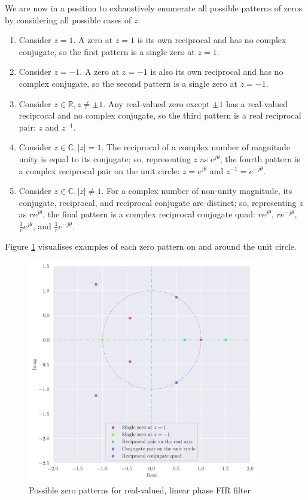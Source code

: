 \newpage

We are now in a position to exhaustively enumerate all possible patterns of zeros by considering all possible cases of $z$.
\begin{enumerate}[label=(\roman*)]
    \item Consider $z=1$. A zero at $z=1$ is its own reciprocal and has no complex conjugate, so the first pattern is a single zero at $z=1$.

    \item Consider $z=-1$. A zero at $z=-1$ is also its own reciprocal and has no complex conjugate, so the second pattern is a single zero at $z=-1$.

    \item Consider $z\in\mathbb{R},z\neq\pm 1$. Any real-valued zero except $\pm 1$ has a real-valued reciprocal and no complex conjugate, so the third pattern is a real reciprocal pair: $z$ and $z^{-1}$.

    \item Consider $z\in\mathbb{C},|z|=1$. The reciprocal of a complex number of magnitude unity is equal to its conjugate; so, representing $z$ as $e^{j\theta}$, the fourth pattern is a complex reciprocal pair on the unit circle: $z=e^{j\theta}$ and $z^{-1}=e^{-j\theta}$.

    \item Consider $z\in\mathbb{C},|z|\neq 1$. For a complex number of non-unity magnitude, its conjugate, reciprocal, and reciprocal conjugate are distinct; so, representing $z$ as $re^{j\theta}$, the final pattern is a complex reciprocal conjugate quad: $re^{j\theta}$, $re^{-j\theta}$, $\frac{1}{r}e^{j\theta}$, and $\frac{1}{r}e^{-j\theta}$.
\end{enumerate}

\bigskip

Figure \ref{fig:zero_patterns} visualises examples of each zero pattern on and around the unit circle.

\begin{figure}[ht]
    \centering
    \includegraphics[width=0.9\textwidth]{images/q1_zero_patterns.png}
    \caption{Possible zero patterns for real-valued, linear phase FIR filter}
    \label{fig:zero_patterns}
\end{figure}
